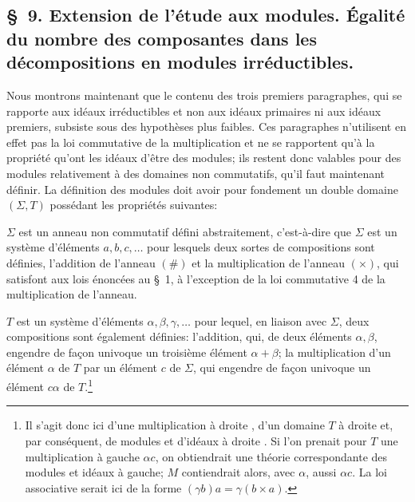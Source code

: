 
\setcounter{footnote}{34}
\subsection*{\S~9. Extension de l'étude aux modules. Égalité du nombre des composantes dans les décompositions en modules irréductibles.}

Nous montrons maintenant que le contenu des trois premiers paragraphes, qui se rapporte aux idéaux irréductibles et non aux idéaux primaires ni aux idéaux premiers, subsiste sous des hypothèses plus faibles. Ces paragraphes n'utilisent en effet pas la loi commutative de la multiplication et ne se rapportent qu'à la propriété qu'ont les idéaux d'être des modules; ils restent donc valables pour des modules relativement à des domaines non commutatifs, qu'il faut maintenant définir. La définition des modules doit avoir pour fondement un double domaine $(\Sigma,T)$ possédant les propriétés suivantes:

$\Sigma$ est un anneau non commutatif défini abstraitement, c'est-à-dire que $\Sigma$ est un système d'éléments $a,b,c,\ldots$ pour lesquels deux sortes de compositions sont définies, l'addition de l'anneau $(\#)$ et la multiplication de l'anneau $(\times)$, qui satisfont aux lois énoncées au \S~1, à l'exception de la loi commutative 4 de la multiplication de l'anneau.

$T$ est un système d'éléments $\alpha,\beta,\gamma,\ldots$ pour lequel, en liaison avec $\Sigma$, deux compositions sont également définies: l'addition, qui, de deux éléments $\alpha,\beta$, engendre de façon univoque un troisième élément $\alpha+\beta$; la multiplication d'un élément $\alpha$ de $T$ par un élément $c$ de $\Sigma$, qui engendre de façon univoque un élément $c\alpha$ de $T$.\footnote{Il s'agit donc ici d'une multiplication \og à droite \fg{}, d'un domaine $T$ \og à droite \fg{} et, par conséquent, de modules et d'idéaux \og à droite \fg{}. Si l'on prenait pour $T$ une multiplication à gauche $\alpha c$, on obtiendrait une théorie correspondante des modules et idéaux à gauche; $M$ contiendrait alors, avec $\alpha$, aussi $\alpha c$. La loi associative serait ici de la forme $(\gamma b)a=\gamma(b\times a)$.}


